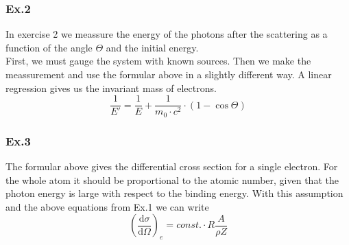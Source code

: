 \newpage

\subsubsection{Ex.2}
In exercise 2 we meassure the energy of the photons after the scattering as a function of the angle $\Theta$ and the initial energy. \\
First, we must gauge the system with known sources. Then we make the meassurement and use the formular above in a slightly different way. A linear regression gives us the invariant mass of electrons.
$$\frac{1}{E'} = \frac{1}{E} + \frac{1}{m_0 \cdot c^{2}} \cdot (1 - \cos \Theta) $$

\subsubsection{Ex.3}
The formular above gives the differential cross section for a single electron. For the whole atom it should be proportional to the atomic number, given that the photon energy is large with respect to the binding energy. With this assumption and the above equations from Ex.1 we can write
$$(\frac{\mathrm{d}\sigma}{\mathrm{d}\Omega})_e = const. \cdot R \frac{A}{\rho Z} $$